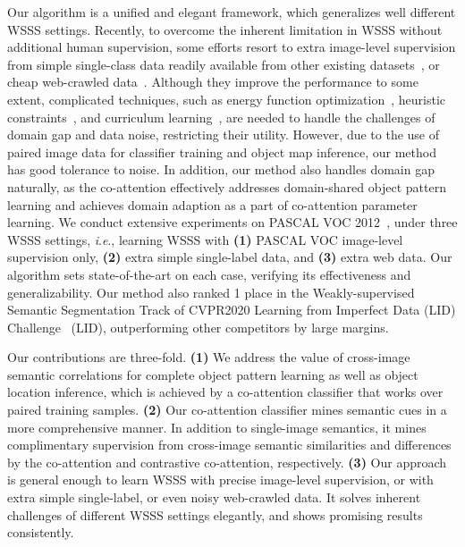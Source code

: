 \documentclass[runningheads]{llncs}
\newcommand{\ie}{\textit{i}.\textit{e}.}
\begin{document}
Our algorithm is a unified and elegant framework, which generalizes well different WSSS settings. Recently, to overcome the inherent limitation in WSSS without additional human supervision, some efforts resort to extra image-level supervision from simple single-class data readily available from other existing datasets~\cite{pinheiro2015image,li2019attention}, or cheap web-crawled data~\cite{shen2017weakly,hong2017weakly,shen2018bootstrapping,wei2016stc}. Although they improve the performance to some extent, complicated techniques, such as energy function optimization~\cite{hong2017weakly,tokmakov2016weakly}, heuristic constraints~\cite{shen2018bootstrapping}, and curriculum learning~\cite{wei2016stc}, are needed to handle the challenges of domain gap and data noise, restricting their utility.  However, due to the use of paired image data for classifier training and object map inference, our method has good tolerance to noise. In addition, our method also handles domain gap naturally, as the co-attention effectively addresses domain-shared object pattern learning and achieves domain adaption as a part of co-attention parameter learning. We conduct extensive experiments on PASCAL VOC 2012~\cite{everingham2015pascal}, under three WSSS settings, \ie, learning WSSS with \textbf{(1)} PASCAL VOC image-level supervision only, \textbf{(2)} extra simple single-label data, and \textbf{(3)} extra web data. Our algorithm sets state-of-the-art on each case, verifying its effectiveness and generalizability. Our method also ranked 1 place in the Weakly-supervised Semantic Segmentation Track of CVPR2020 Learning from Imperfect Data (LID) Challenge\!~\cite{lid2020} (LID), outperforming other competitors by large margins.

Our contributions are three-fold. \textbf{(1)} We address the value of cross-image semantic correlations for complete object pattern learning as well as object location inference, which is achieved by a co-attention classifier that works over paired training samples. \textbf{(2)} Our co-attention classifier mines semantic cues in a more comprehensive manner. In addition to single-image semantics, it mines complimentary supervision from cross-image semantic similarities and differences by the co-attention and contrastive co-attention, respectively. \textbf{(3)} Our approach is general enough to learn WSSS with precise image-level supervision, or with extra simple single-label, or even noisy web-crawled data. It solves inherent challenges of different WSSS settings elegantly, and shows promising results consistently.
\end{document}
